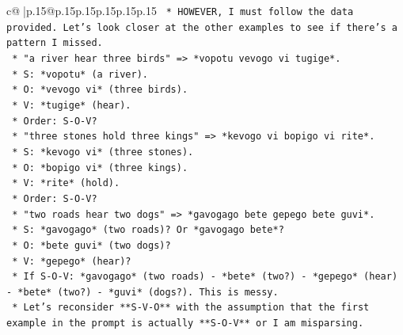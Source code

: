 \documentclass{article}
\begin{document}
{\begin{supertabular}{c@{$\;$}|p{.15\linewidth}@{}p{.15\linewidth}p{.15\linewidth}p{.15\linewidth}p{.15\linewidth}p{.15\linewidth}}
{{{\texttt{                                                    *   HOWEVER, I must follow the data provided. Let's look closer at the other examples to see if there's a pattern I missed.} \\
\texttt{                                                    *   "a river hear three birds" => *vopotu vevogo vi tugige*.} \\
\texttt{                                                        *   S: *vopotu* (a river).} \\
\texttt{                                                        *   O: *vevogo vi* (three birds).} \\
\texttt{                                                        *   V: *tugige* (hear).} \\
\texttt{                                                        *   Order: S{-}O{-}V?} \\
\texttt{                                                    *   "three stones hold three kings" => *kevogo vi bopigo vi rite*.} \\
\texttt{                                                        *   S: *kevogo vi* (three stones).} \\
\texttt{                                                        *   O: *bopigo vi* (three kings).} \\
\texttt{                                                        *   V: *rite* (hold).} \\
\texttt{                                                        *   Order: S{-}O{-}V?} \\
\texttt{                                                    *   "two roads hear two dogs" => *gavogago bete gepego bete guvi*.} \\
\texttt{                                                        *   S: *gavogago* (two roads)? Or *gavogago bete*?} \\
\texttt{                                                        *   O: *bete guvi* (two dogs)?} \\
\texttt{                                                        *   V: *gepego* (hear)?} \\
\texttt{                                                        *   If S{-}O{-}V: *gavogago* (two roads) {-} *bete* (two?) {-} *gepego* (hear) {-} *bete* (two?) {-} *guvi* (dogs?). This is messy.} \\
\texttt{                                                    *   Let's reconsider **S{-}V{-}O** with the assumption that the first example in the prompt is actually **S{-}O{-}V** or I am misparsing.} \\
}}}
\end{supertabular}}
\end{document}
